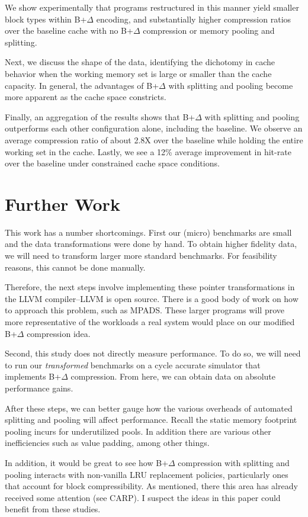 \documentclass[pageno]{jpaper}
\begin{document}
We show experimentally that programs restructured in this manner yield smaller block types within B+$\Delta$ encoding, and substantially higher compression ratios over the baseline cache with no B+$\Delta$ compression or memory pooling and splitting.

 Next, we discuss the shape of the data, identifying the dichotomy in cache behavior when the working memory set is large or smaller than the cache capacity. In general, the advantages of B+$\Delta$ with splitting and pooling become more apparent as the cache space constricts.

Finally, an aggregation of the results shows that B+$\Delta$ with splitting and pooling outperforms each other configuration alone, including the baseline. We observe an average compression ratio of about 2.8X over the baseline while holding the entire working set in the cache. Lastly, we see a 12\% average improvement in hit-rate over the baseline under constrained cache space conditions.


\section{Further Work}
This work has a number shortcomings. First our (micro) benchmarks are small and the data transformations were done by hand. To obtain higher fidelity data, we will need to transform larger more standard benchmarks. For feasibility reasons, this cannot be done manually.

Therefore, the next steps involve implementing these pointer transformations in the LLVM compiler--LLVM is open source. There is a good body of work on how to approach this problem, such as MPADS\cite{mpads}. These larger programs will prove more representative of the workloads a real system would place on our modified B+$\Delta$ compression idea.

Second, this study does not directly measure performance. To do so, we will need to run our \textit{transformed} benchmarks on a cycle accurate simulator that implements B+$\Delta$ compression. From here, we can obtain data on absolute performance gains.

After these steps, we can better gauge how the various overheads of automated splitting and pooling will affect performance. Recall the static memory footprint pooling incurs for underutilized pools. In addition there are various other inefficiencies such as value padding, among other things.

In addition, it would be great to see how B+$\Delta$ compression with splitting and pooling interacts with non-vanilla LRU replacement policies, particularly ones that account for block compressibility. As mentioned, there this area has already received some attention (see CARP\cite{carp}). I suspect the ideas in this paper could benefit  from these studies.
\end{document}

